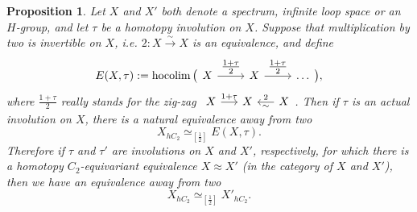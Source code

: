 \documentclass[a4paper, oneside]{amsart}
\DeclareMathOperator{\hocolim}{\operatorname{hocolim}}
\newcommand{\1}{\mathds{1}}
\newtheorem{prop}[thm]{Proposition}
\theoremstyle{remark}
\theoremstyle{definition}
\numberwithin{equation}{section}
\begin{document}
\begin{prop}\label{hC2construction}
    Let $X$ and $X'$ both denote a spectrum, infinite loop space or an $H$-group, and let $\tau$ be a homotopy involution on $X$. Suppose that multiplication by two is invertible on $X$, i.e. $2: X\overset{\sim}\longrightarrow X$ is an equivalence, and define
    $$
E(X,\tau):=\hocolim\big(\begin{tikzcd}
  X\rar["\tfrac{1+\tau}{2}"]& X\rar["\tfrac{1+\tau}{2}"]&\dots
\end{tikzcd}\big),
    $$
    where $\frac{1+\tau}{2}$ really stands for the zig-zag $\begin{tikzcd}[column sep=15pt]
        X\rar["1+\tau"] &X&\lar["2"', "\sim"] X
    \end{tikzcd}$. Then if $\tau$ is an actual involution on $X$, there is a natural equivalence away from two
    $$
X_{hC_2}\simeq_{[\frac{1}{2}]} E(X,\tau).
    $$
    Therefore if $\tau$ and $\tau'$ are involutions on $X$ and $X'$, respectively, for which there is a homotopy $C_2$-equivariant equivalence $X\approx X'$ (in the category of $X$ and $X'$), then we have an equivalence away from two
    $$
X_{hC_2}\simeq_{[\frac{1}{2}]} X'_{hC_2}.
    $$
\end{prop}
\end{document}
